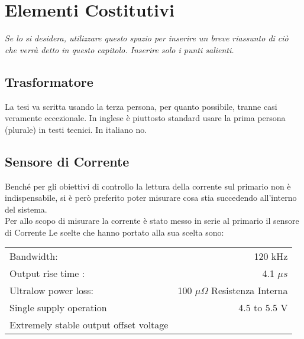 \chapter{Elementi Costitutivi}\label{Hardware}

\begin{minipage}{12cm}\textit{Se lo si desidera, utilizzare questo spazio per inserire un breve riassunto di ci\`o che verr\`a detto in questo capitolo. Inserire solo i punti salienti.}
\end{minipage}

\vspace*{1cm}


\section{Trasformatore}\label{Trasformatore}

La tesi va scritta usando la terza persona, per quanto possibile, tranne casi veramente eccezionale. In inglese \`e piuttosto standard usare la prima persona (plurale) in testi tecnici. In italiano no.

\newpage


\section{Sensore di Corrente}\label{CurrentSense}
Benché per gli obiettivi di controllo la lettura della corrente sul primario non è indispensabile, si è però preferito poter misurare cosa stia succedendo all'interno del sistema.\\
Per allo scopo di misurare la corrente è stato messo in serie al primario il sensore di Corrente \cite{ACS770}
Le scelte che hanno portato alla sua scelta sono: \vspace{-8mm}
\begin{center}
	\begin{tabular}[t]{|l r|}
		\hline
		Bandwidth:                             & 120 kHz                               \\
		Output rise time :                     & 4.1 $ \mu s $                         \\
		Ultralow power loss:                   & 100 $ \mu \Omega $ Resistenza Interna \\
		Single supply operation                & 4.5 to 5.5 V                          \\
		Extremely stable output offset voltage &                                       \\
		\hline
	\end{tabular}
\end{center}

